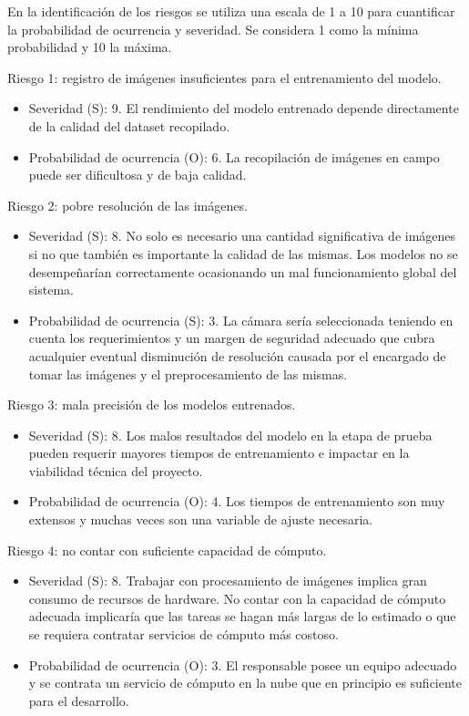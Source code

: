 \documentclass[
11pt %
]{charter}
\begin{document}
En la identificación de los riesgos se utiliza una escala de 1 a 10 para cuantificar la probabilidad de ocurrencia y severidad. Se considera 1 como la mínima probabilidad y 10 la máxima.

Riesgo 1: registro de imágenes insuficientes para el entrenamiento del modelo.
\begin{itemize}
	\item Severidad (S): 9. El rendimiento del modelo entrenado depende directamente de la calidad del dataset recopilado.
	\item Probabilidad de ocurrencia (O): 6. La recopilación de imágenes en campo puede ser dificultosa y de baja calidad.
\end{itemize}

Riesgo 2: pobre resolución de las imágenes.
\begin{itemize}
	\item Severidad (S): 8. No solo es necesario una cantidad significativa de imágenes si no que también es importante la calidad de las mismas. Los modelos no se desempeñarían correctamente ocasionando un mal funcionamiento global del sistema.
	\item Probabilidad de ocurrencia (S): 3. La cámara sería seleccionada teniendo en cuenta los requerimientos y un margen de seguridad adecuado que cubra acualquier eventual
disminución de resolución causada por el encargado de tomar las imágenes y el preprocesamiento de las mismas.
\end{itemize}

Riesgo 3: mala precisión de los modelos entrenados.
\begin{itemize}
	\item Severidad (S): 8. Los malos resultados del modelo en la etapa de prueba pueden requerir mayores tiempos de entrenamiento e impactar en la viabilidad técnica del proyecto.
	\item Probabilidad de ocurrencia (O): 4. Los tiempos de entrenamiento son muy extensos y
muchas veces son una variable de ajuste necesaria.
\end{itemize}

Riesgo 4: no contar con suficiente capacidad de cómputo.
\begin{itemize}
	\item Severidad (S): 8. Trabajar con procesamiento de imágenes implica gran consumo de recursos de hardware. No contar con la capacidad de cómputo adecuada implicaría que las tareas se hagan más largas de lo estimado o que se requiera contratar servicios de cómputo más costoso.
	\item Probabilidad de ocurrencia (O): 3. El responsable posee un equipo adecuado y se contrata un servicio de cómputo en la nube que en principio es suficiente para el desarrollo.
\end{itemize}
\end{document}
